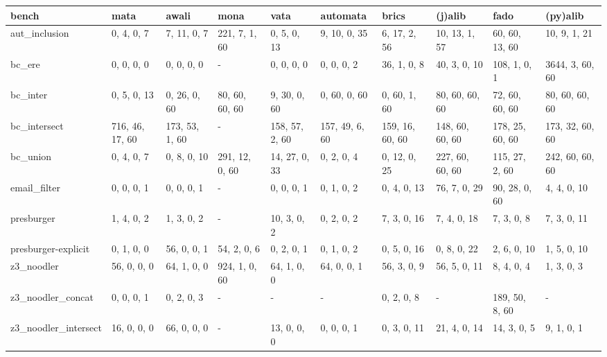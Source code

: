 \begin{tabular}{llllllllll}
\hline
 bench                & mata            & awali          & mona           & vata           & automata       & brics           & (j)alib         & fado            & (py)alib        \\
\hline
 aut_inclusion        & 0, 4, 0, 7      & 7, 11, 0, 7    & 221, 7, 1, 60  & 0, 5, 0, 13    & 9, 10, 0, 35   & 6, 17, 2, 56    & 10, 13, 1, 57   & 60, 60, 13, 60  & 10, 9, 1, 21    \\
 bc_ere               & 0, 0, 0, 0      & 0, 0, 0, 0     & -              & 0, 0, 0, 0     & 0, 0, 0, 2     & 36, 1, 0, 8     & 40, 3, 0, 10    & 108, 1, 0, 1    & 3644, 3, 60, 60 \\
 bc_inter             & 0, 5, 0, 13     & 0, 26, 0, 60   & 80, 60, 60, 60 & 9, 30, 0, 60   & 0, 60, 0, 60   & 0, 60, 1, 60    & 80, 60, 60, 60  & 72, 60, 60, 60  & 80, 60, 60, 60  \\
 bc_intersect         & 716, 46, 17, 60 & 173, 53, 1, 60 & -              & 158, 57, 2, 60 & 157, 49, 6, 60 & 159, 16, 60, 60 & 148, 60, 60, 60 & 178, 25, 60, 60 & 173, 32, 60, 60 \\
 bc_union             & 0, 4, 0, 7      & 0, 8, 0, 10    & 291, 12, 0, 60 & 14, 27, 0, 33  & 0, 2, 0, 4     & 0, 12, 0, 25    & 227, 60, 60, 60 & 115, 27, 2, 60  & 242, 60, 60, 60 \\
 email_filter         & 0, 0, 0, 1      & 0, 0, 0, 1     & -              & 0, 0, 0, 1     & 0, 1, 0, 2     & 0, 4, 0, 13     & 76, 7, 0, 29    & 90, 28, 0, 60   & 4, 4, 0, 10     \\
 presburger           & 1, 4, 0, 2      & 1, 3, 0, 2     & -              & 10, 3, 0, 2    & 0, 2, 0, 2     & 7, 3, 0, 16     & 7, 4, 0, 18     & 7, 3, 0, 8      & 7, 3, 0, 11     \\
 presburger-explicit  & 0, 1, 0, 0      & 56, 0, 0, 1    & 54, 2, 0, 6    & 0, 2, 0, 1     & 0, 1, 0, 2     & 0, 5, 0, 16     & 0, 8, 0, 22     & 2, 6, 0, 10     & 1, 5, 0, 10     \\
 z3_noodler           & 56, 0, 0, 0     & 64, 1, 0, 0    & 924, 1, 0, 60  & 64, 1, 0, 0    & 64, 0, 0, 1    & 56, 3, 0, 9     & 56, 5, 0, 11    & 8, 4, 0, 4      & 1, 3, 0, 3      \\
 z3_noodler_concat    & 0, 0, 0, 1      & 0, 2, 0, 3     & -              & -              & -              & 0, 2, 0, 8      & -               & 189, 50, 8, 60  & -               \\
 z3_noodler_intersect & 16, 0, 0, 0     & 66, 0, 0, 0    & -              & 13, 0, 0, 0    & 0, 0, 0, 1     & 0, 3, 0, 11     & 21, 4, 0, 14    & 14, 3, 0, 5     & 9, 1, 0, 1      \\
\hline
\end{tabular}